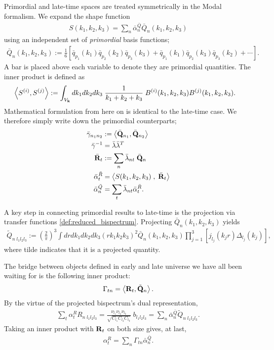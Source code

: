Primordial and late-time spaces are treated symmetrically in the Modal formalism. We expand the shape function
\begin{align}
	S(k_1,k_2,k_3) = \sum_n \bar{\alpha}^{\bar{Q}}_n \bar{Q}_n (k_1, k_2, k_3)
\end{align}
using an independent set of \textit{primordial} basis functions;
\begin{align}
	\bar{Q}_{n} (k_1, k_2, k_3) := \frac{1}{6} \left[ \bar{q}_{p_1}(k_1) \bar{q}_{p_2}(k_2) \bar{q}_{p_3}(k_3) + \bar{q}_{p_1}(k_1) \bar{q}_{p_2}(k_3) \bar{q}_{p_3}(k_2) + \cdots \right].
\end{align}
A bar is placed above each variable to denote they are primordial quantities. The inner product is defined as \cite{Fergusson2010general}
\begin{align}
	\left< S^{(i)}, S^{(j)} \right> &:= \int_{V_\mathbf{k}} dk_1 dk_2 dk_3 \; \frac{1}{k_1+k_2+k_3} \; B^{(i)}(k_1, k_2, k_3) B^{(j)}(k_1, k_2, k_3).
\end{align}
Mathematical formulation from here on is identical to the late-time case. We therefore simply write down the primordial counterparts;
\begin{align}
	\bar{\gamma}_{n_1 n_2} &:=  \left< \bar{\mathbf{Q}}_{n_1} , \bar{\mathbf{Q}}_{n_2} \right> \\
	\bar{\gamma}^{-1} &= \bar{\lambda} \bar{\lambda}^T \\
	\bar{\mathbf{R}}_t &:= \sum_n \bar{\lambda}_{nt} \; \bar{\mathbf{Q}}_{n} \\
	\bar{\alpha}^{\bar{R}}_t &= \left< S(k_1,k_2,k_3) \;,\; \bar{\mathbf{R}}_t \right> \\
	\bar{\alpha}^{\bar{Q}}_n &= \sum_t \bar{\lambda}_{nt} \bar{\alpha}^{\bar{R}}_t.
\end{align}

A key step in connecting primordial results to late-time is the projection via transfer functions \eqref{def:reduced_bispectrum}. Projecting $\bar{Q}_n(k_1,k_2,k_3)$ yields
\begin{align}
	\tilde{Q}_{n \; l_1 l_2 l_3} := \left( \frac{2}{\pi} \right)^3 \int dr dk_1 dk_2 dk_3 \left(r k_1 k_2 k_3 \right)^2 \bar{Q}_n (k_1, k_2, k_3) \prod_{j=1}^{3} \left[ j_{l_j} (k_j r) \Delta_{l_j} (k_j) \right],
\end{align}
where tilde indicates that it is a projected quantity.

The bridge between objects defined in early and late universe we have all been waiting for is the following inner product:
\begin{align}
	\Gamma_{tn} = \left< \mathbf{R}_{t}, \tilde{\mathbf{Q}}_n \right>.
\end{align}
By the virtue of the projected bispectrum's dual representation,
\begin{align}
	\sum_t \alpha^R_t R_{n \; l_1 l_2 l_3} = \frac{\nu_{l_1} \nu_{l_2} \nu_{l_3}}{\sqrt{C_{l_1} C_{l_2} C_{l_3}}} \; b_{l_1 l_2 l_3} = \sum_n \bar{\alpha}^{\bar{Q}}_n \tilde{Q}_{n \; l_1 l_2 l_3}.
\end{align}
Taking an inner product with $\mathbf{R}_t$ on both size gives, at last,
\begin{align}
	\alpha^R_t = \sum_n \Gamma_{tn} \bar{\alpha}^{\bar{Q}}_n.
\end{align}

